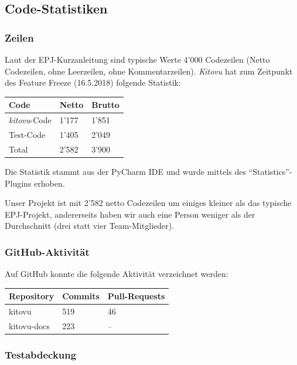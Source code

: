 \documentclass[a4paper]{article}
\begin{document}
\subsection{Code-Statistiken}

\subsubsection{Zeilen}

Laut der EPJ-Kurzanleitung sind typische Werte 4'000 Codezeilen (Netto Codezeilen, ohne Leerzeilen, ohne Kommentarzeilen). \emph{Kitovu} hat zum Zeitpunkt des Feature Freeze (16.5.2018) folgende Statistik:

\begin{tabulary}{\linewidth}{lll}
  \toprule
  \textbf{Code} & \textbf{Netto} & \textbf{Brutto} \\
  \midrule
  \emph{kitovu}-Code & 1'177 & 1'851 \\
  Test-Code & 1'405 & 2'049 \\
  \midrule
  Total & 2'582 & 3'900 \\
  \bottomrule
\end{tabulary}

Die Statistik stammt aus der PyCharm IDE und wurde mittels des ``Statistics''-Plugins erhoben.

Unser Projekt ist mit 2'582 netto Codezeilen um einiges kleiner als das typische EPJ-Projekt, andererseits haben wir auch eine Person weniger als der Durchschnitt (drei statt vier Team-Mitglieder).

\subsubsection{GitHub-Aktivität}

Auf GitHub konnte die folgende Aktivität verzeichnet werden:

\begin{tabulary}{\linewidth}{lll}
  \toprule
  \textbf{Repository} & \textbf{Commits} & \textbf{Pull-Requests} \\
  \midrule
  kitovu & 519 & 46 \\
  kitovu-docs & 223 & -- \\
  \bottomrule
\end{tabulary}

\subsubsection{Testabdeckung}
\end{document}
